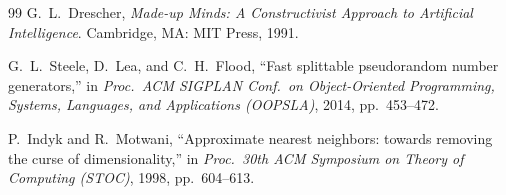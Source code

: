 \documentclass[journal,onecolumn,11pt]{IEEEtran}
\theoremstyle{definition}
\begin{document}
\begin{thebibliography}{99}
G.~L.~Drescher, \emph{Made-up Minds: A Constructivist Approach to Artificial Intelligence}.
Cambridge, MA: MIT Press, 1991.

G.~L.~Steele, D.~Lea, and C.~H.~Flood,
``Fast splittable pseudorandom number generators,''
in \emph{Proc.\ ACM SIGPLAN Conf.\ on Object-Oriented Programming, Systems, Languages, and Applications (OOPSLA)}, 2014, pp.~453--472.

P.~Indyk and R.~Motwani,
``Approximate nearest neighbors: towards removing the curse of dimensionality,''
in \emph{Proc.\ 30th ACM Symposium on Theory of Computing (STOC)}, 1998, pp.~604--613.

\end{thebibliography}
\end{document}
